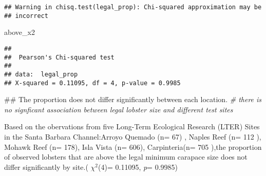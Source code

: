 \documentclass[]{article}
\newenvironment{Shaded}{\begin{snugshade}}{\end{snugshade}}
\newcommand{\CommentTok}[1]{\textcolor[rgb]{0.56,0.35,0.01}{\textit{{#1}}}}
\newcommand{\NormalTok}[1]{{#1}}
\begin{document}
\begin{verbatim}
## Warning in chisq.test(legal_prop): Chi-squared approximation may be
## incorrect
\end{verbatim}

\begin{Shaded}
\begin{Highlighting}[]
\NormalTok{above_x2}
\end{Highlighting}
\end{Shaded}

\begin{verbatim}
## 
##  Pearson's Chi-squared test
## 
## data:  legal_prop
## X-squared = 0.11095, df = 4, p-value = 0.9985
\end{verbatim}

\begin{Shaded}
\begin{Highlighting}[]
\NormalTok{## The proportion does not differ significantly between each location. }
\CommentTok{# there is no signficant association between legal lobster size and different test sites }
\end{Highlighting}
\end{Shaded}

Based on the obervations from five Long-Term Ecological Research (LTER)
Sites in the Santa Barbara Channel:Arroyo Quemado (n= 67) , Naples Reef
(n= 112 ), Mohawk Reef (n= 178), Isla Vista (n= 606), Carpinteria(n= 705
),the proportion of observed lobsters that are above the legal minimum
carapace size does not differ significantly by site.(
\emph{\(\chi\)\(^2\)}(4)= 0.11095, \emph{p}= 0.9985)
\end{document}
